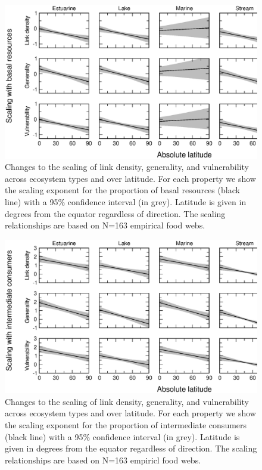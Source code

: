 \documentclass[12pt]{article}
\begin{document}
\begin{figure}[!h]
\centerline{\includegraphics*[width=.8\textwidth]{Figures/by_TL/marginal/B_marginal_latitude_proportions.eps}}
\caption{Changes to the scaling of link density, generality, and vulnerability across ecosystem
types and over latitude. For each property we show the scaling exponent for the proportion of
basal resources (black line) with a 95\% confidence interval (in grey). Latitude is given in degrees
from the equator regardless of direction. The scaling relationships are based on N=163 empirical food webs.}
\label{B}
\end{figure}

\newpage


\begin{figure}[h]
\centerline{\includegraphics*[width=.8\textwidth]{Figures/by_TL/marginal/I_marginal_latitude_proportions.eps}}
\caption{Changes to the scaling of link density, generality, and vulnerability across ecosystem
types and over latitude. For each property we show the scaling exponent for the proportion of
intermediate consumers (black line) with a 95\% confidence interval (in grey). Latitude is given in degrees
from the equator regardless of direction. The scaling relationships are based on N=163 empiricl food webs.}
\label{I}
\end{figure}
\end{document}
